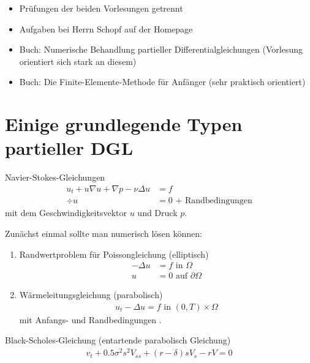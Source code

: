 \begin{itemize}
\item Prüfungen der beiden Vorlesungen getrennt
\item Aufgaben bei Herrn Schopf auf der Homepage
\item Buch: Numerische Behandlung partieller Differentialgleichungen (Vorlesung orientiert sich stark an diesem)
\item Buch: Die Finite-Elemente-Methode für Anfänger (sehr praktisch orientiert)
\end{itemize}
\section{Einige grundlegende Typen partieller DGL}
\begin{beispiel} Navier-Stokes-Gleichungen
  \begin{align*}
    u_t + u \nabla u + \nabla p - \nu \Delta u &= f \\
    \div u &= 0 \text{ + Randbedingungen}
  \end{align*}
  mit dem Geschwindigkeitsvektor $u$ und Druck $p$.
\end{beispiel}
Zunächst einmal sollte man numerisch lösen können:
\begin{enumerate}
\item Randwertproblem für Poissongleichung (elliptisch)
  \begin{align*}
    - \Delta u &= f \text{ in $\Omega$}\\
    u &= 0 \text{ auf } \partial \Omega
  \end{align*}
\item Wärmeleitungsgleichung (parabolisch)
  \begin{align*}
    u_t - \Delta u = f \text{ in $(0,T) \times \Omega$}
  \end{align*}
mit Anfangs- und Randbedingungen .
\end{enumerate}
\begin{beispiel} Black-Scholes-Gleichung (entartende parabolisch Gleichung)
  \begin{align*}
    v_t + 0.5 \sigma^2 s^2 V_{ss} + (r - \delta)s V_s -r V = 0
  \end{align*}
  
\end{beispiel}
